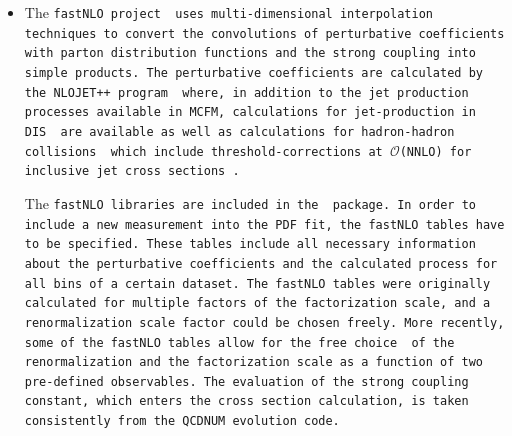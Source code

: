 \begin{description}
\begin{itemize}
\item
The \tt fastNLO \rm project~\cite{Kluge:2006xs,Wobisch:2011ij,Britzger:2012bs}
uses multi-dimensional interpolation
techniques to convert the convolutions of perturbative 
coefficients with parton distribution functions and 
the strong coupling into simple products.
The perturbative 
coefficients are calculated by the \texttt{NLOJET++}
program~\cite{Nagy:1998bb} where, 
in addition to the jet production processes available in MCFM,
calculations for jet-production
in DIS~\cite{Nagy:2001xb} are available as well as calculations for 
hadron-hadron 
collisions~\cite{Nagy:2003tz,Nagy:2001fj} which include
 threshold-corrections 
at $\mathcal{O}$(NNLO) for inclusive jet cross 
sections~\cite{Kidonakis:2000gi}.

The \tt fastNLO \rm  libraries are included in the \fitter\ package.
In order to include a new measurement into the PDF fit,
the \tt fastNLO \rm tables have to be specified. These tables include all
necessary information about the perturbative coefficients and the
calculated process for all bins of a certain dataset. 
%
The \tt fastNLO \rm  tables were originally calculated
for multiple factors of the factorization scale, 
and a renormalization scale factor could be chosen freely.
More recently, some of the \tt fastNLO \rm  tables allow for 
the free choice~\cite{Britzger:2012bs} of the renormalization and the factorization
scale as a function of two pre-defined observables.
The evaluation of the strong coupling constant, which enters
the cross section calculation, is taken consistently from the 
QCDNUM evolution code.


\end{itemize}
\end{description}
